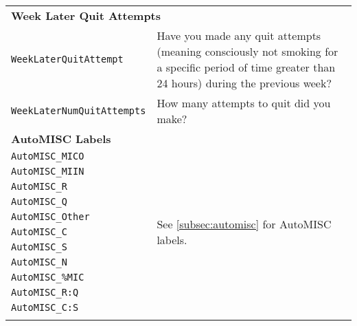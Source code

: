 \begin{longtable}{l p{10cm}}
\multicolumn{2}{l}{\textbf{Week Later Quit Attempts}} \\
\texttt{WeekLaterQuitAttempt} & Have you made any quit attempts (meaning consciously not smoking for a specific period of time greater than 24 hours) during the previous week?\\
\texttt{WeekLaterNumQuitAttempts} & How many attempts to quit did you make?\\
\midrule

\multicolumn{2}{l}{\textbf{AutoMISC Labels}} \\
\texttt{AutoMISC\_MICO} & \multirow{11}{*}{See \cref{subsec:automisc} for AutoMISC labels.}\\
\texttt{AutoMISC\_MIIN} &\\
\texttt{AutoMISC\_R} &\\
\texttt{AutoMISC\_Q} &\\
\texttt{AutoMISC\_Other} &\\
\texttt{AutoMISC\_C} &\\
\texttt{AutoMISC\_S} &\\
\texttt{AutoMISC\_N} &\\
\texttt{AutoMISC\_\%MIC} &\\
\texttt{AutoMISC\_R:Q} &\\
\texttt{AutoMISC\_C:S} &\\





\label{tab:datadesc}
\end{longtable}



\vspace{1em}


